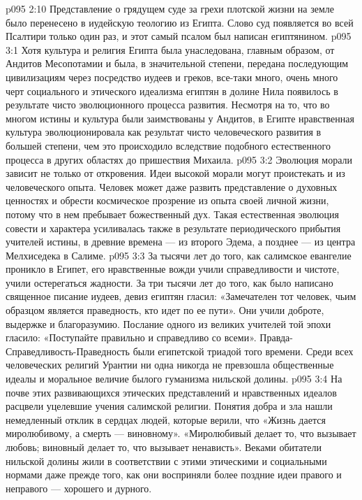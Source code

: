\vs p095 2:10 Представление о грядущем суде за грехи плотской жизни на земле было перенесено в иудейскую теологию из Египта. Слово суд появляется во всей Псалтири только один раз, и этот самый псалом был написан египтянином.
\vs p095 3:1 Хотя культура и религия Египта была унаследована, главным образом, от Андитов Месопотамии и была, в значительной степени, передана последующим цивилизациям через посредство иудеев и греков, все\hyp{}таки много, очень много черт социального и этического идеализма египтян в долине Нила появилось в результате чисто эволюционного процесса развития. Несмотря на то, что во многом истины и культура были заимствованы у Андитов, в Египте нравственная культура эволюционировала как результат чисто человеческого развития в большей степени, чем это происходило вследствие подобного естественного процесса в других областях до пришествия Михаила.
\vs p095 3:2 Эволюция морали зависит не только от откровения. Идеи высокой морали могут проистекать и из человеческого опыта. Человек может даже развить представление о духовных ценностях и обрести космическое прозрение из опыта своей личной жизни, потому что в нем пребывает божественный дух. Такая естественная эволюция совести и характера усиливалась также в результате периодического прибытия учителей истины, в древние времена --- из второго Эдема, а позднее --- из центра Мелхиседека в Салиме.
\vs p095 3:3 За тысячи лет до того, как салимское евангелие проникло в Египет, его нравственные вожди учили справедливости и чистоте, учили остерегаться жадности. За три тысячи лет до того, как было написано священное писание иудеев, девиз египтян гласил: «Замечателен тот человек, чьим образцом является праведность, кто идет по ее пути». Они учили доброте, выдержке и благоразумию. Послание одного из великих учителей той эпохи гласило: «Поступайте правильно и справедливо со всеми». Правда\hyp{}Справедливость\hyp{}Праведность были египетской триадой того времени. Среди всех человеческих религий Урантии ни одна никогда не превзошла общественные идеалы и моральное величие былого гуманизма нильской долины.
\vs p095 3:4 На почве этих развивающихся этических представлений и нравственных идеалов расцвели уцелевшие учения салимской религии. Понятия добра и зла нашли немедленный отклик в сердцах людей, которые верили, что «Жизнь дается миролюбивому, а смерть --- виновному». «Миролюбивый делает то, что вызывает любовь; виновный делает то, что вызывает ненависть». Веками обитатели нильской долины жили в соответствии с этими этическими и социальными нормами даже прежде того, как они восприняли более поздние идеи правого и неправого --- хорошего и дурного.
